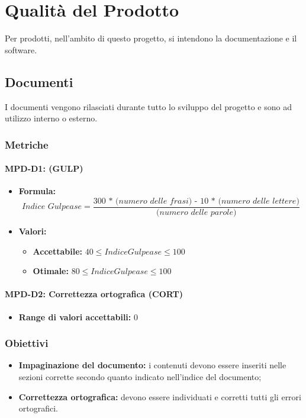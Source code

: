 \section{Qualità del Prodotto} \label{_qualitaProdotto}
Per prodotti, nell'ambito di questo progetto, si intendono la documentazione e il software.

\subsection{Documenti}\label{_documenti}
I documenti vengono rilasciati durante tutto lo sviluppo del progetto e sono ad utilizzo interno o esterno.

\subsubsection{Metriche}

\paragraph{MPD-D1:  (GULP)}
\begin{itemize}
    \item \textbf{Formula:} \[\textit{Indice Gulpease} = \frac{\textit{300 * (numero delle frasi) - 10 * (numero delle lettere)}}{\textit{(numero delle parole)}}\]
    \item \textbf{Valori:}
          \begin{itemize}
              \item \textbf{Accettabile:} $40 \leq Indice Gulpease \leq 100$
              \item \textbf{Otimale:} $80 \leq Indice Gulpease \leq 100$
          \end{itemize}
\end{itemize}

\paragraph{MPD-D2: Correttezza ortografica (CORT)}
\begin{itemize}
    \item  \textbf{Range di valori accettabili:} 0
\end{itemize}

\subsubsection{Obiettivi}
\begin{itemize}
    \item \textbf{Impaginazione del documento:} i contenuti devono essere inseriti nelle sezioni corrette secondo quanto indicato nell'indice del documento;
    \item \textbf{Correttezza ortografica:} devono essere individuati e corretti tutti gli errori ortografici.
\end{itemize}

